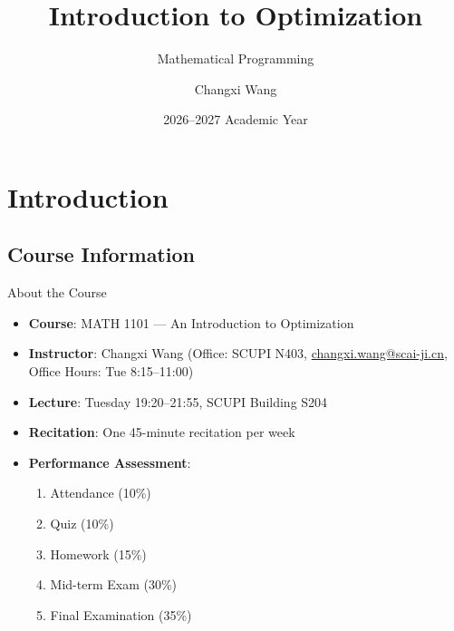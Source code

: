\documentclass[aspectratio=169,hyperref,UTF8,CJK]{beamer}
\title[Introduction to Optimization]{Introduction to Optimization}
\subtitle{Mathematical Programming}
\author[Changxi Wang]{Changxi Wang}
\institute{Sichuan University-Pittsburgh Institute\\Chengdu, China}
\date{2026--2027 Academic Year}
\begin{document}

\section{Introduction}
\subsection{Course Information}

\begin{frame}{About the Course}
  \footnotesize
  \begin{itemize}
    \item \textbf{Course}: MATH 1101 --- An Introduction to Optimization
    \item \textbf{Instructor}: Changxi Wang (Office: SCUPI N403, \url{changxi.wang@scai-ji.cn}, Office Hours: Tue 8:15--11:00)
    \item \textbf{Lecture}: Tuesday 19:20--21:55, SCUPI Building S204
    \item \textbf{Recitation}: One 45-minute recitation per week
    \item \textbf{Performance Assessment}:
      \begin{enumerate}
        \item Attendance (10\%)
        \item Quiz (10\%)
        \item Homework (15\%)
        \item Mid-term Exam (30\%)
        \item Final Examination (35\%)
      \end{enumerate}
  \end{itemize}
\end{frame}
\end{document}
